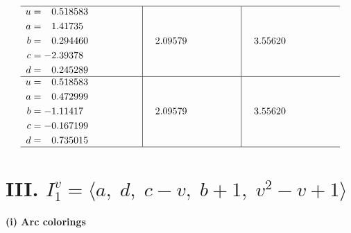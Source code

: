 \documentclass[1p]{elsarticle_modified}
\theoremstyle{definition}
\begin{document}
$$\begin{array}{c|c|c}
 \hline 
\begin{aligned}
u &= \phantom{-}0.518583\phantom{ +0.000000I} \\
a &= \phantom{-}1.41735\phantom{ +0.000000I} \\
b &= \phantom{-}0.294460\phantom{ +0.000000I} \\
c &= -2.39378\phantom{ +0.000000I} \\
d &= \phantom{-}0.245289\phantom{ +0.000000I}\end{aligned}
 & \phantom{-}2.09579\phantom{ +0.000000I} & \phantom{-}3.55620\phantom{ +0.000000I} \\ \hline\begin{aligned}
u &= \phantom{-}0.518583\phantom{ +0.000000I} \\
a &= \phantom{-}0.472999\phantom{ +0.000000I} \\
b &= -1.11417\phantom{ +0.000000I} \\
c &= -0.167199\phantom{ +0.000000I} \\
d &= \phantom{-}0.735015\phantom{ +0.000000I}\end{aligned}
 & \phantom{-}2.09579\phantom{ +0.000000I} & \phantom{-}3.55620\phantom{ +0.000000I}\\
 \hline 
 \end{array}$$\newpage\newpage\renewcommand{\arraystretch}{1}
\centering \section*{III. $I^v_{1}= \langle a,\;d,\;c- v,\;b+1,\;v^2- v+1 \rangle$}
\flushleft \textbf{(i) Arc colorings}\\
\end{document}
